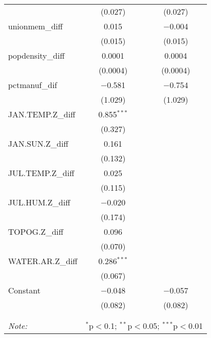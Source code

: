 \begin{table}[!htbp]
\begin{tabular}{@{\extracolsep{5pt}}lcc}
  & (0.027) & (0.027) \\ 
  unionmem\_diff & 0.015 & $-$0.004 \\ 
  & (0.015) & (0.015) \\ 
  popdensity\_diff & 0.0001 & 0.0004 \\ 
  & (0.0004) & (0.0004) \\ 
  pctmanuf\_dif & $-$0.581 & $-$0.754 \\ 
  & (1.029) & (1.029) \\ 
  JAN.TEMP.Z\_diff & 0.855$^{***}$ &  \\ 
  & (0.327) &  \\ 
  JAN.SUN.Z\_diff & 0.161 &  \\ 
  & (0.132) &  \\ 
  JUL.TEMP.Z\_diff & 0.025 &  \\ 
  & (0.115) &  \\ 
  JUL.HUM.Z\_diff & $-$0.020 &  \\ 
  & (0.174) &  \\ 
  TOPOG.Z\_diff & 0.096 &  \\ 
  & (0.070) &  \\ 
  WATER.AR.Z\_diff & 0.286$^{***}$ &  \\ 
  & (0.067) &  \\ 
  Constant & $-$0.048 & $-$0.057 \\ 
  & (0.082) & (0.082) \\ 
 \hline \\[-1.8ex] 
\hline 
\hline \\[-1.8ex] 
\textit{Note:}  & \multicolumn{2}{r}{$^{*}$p$<$0.1; $^{**}$p$<$0.05; $^{***}$p$<$0.01} \\ 
\end{tabular} 
\end{table} 
